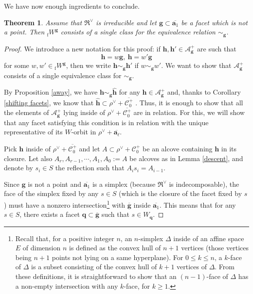 \documentclass[11pt]{amsart}
\theoremstyle{plain}
\newtheorem{thm}{Theorem}[section]
\theoremstyle{remark}
\numberwithin{equation}{section}
\begin{document}
	
	We have now enough ingredients to conclude.
	\begin{thm}\label{thm not points}
		Assume that $\mathfrak{R}^\vee$ is irreducible and let $\mathbf{g}\subset\overline{\mathbf{a}_1}$ be a facet which is not a point. Then ${_\mathrm{f}W}^\mathbf{g}$ consists of a single class for the equivalence relation $\sim_{\mathbf{g}}$.
	\end{thm}
	\begin{proof}We introduce a new notation for this proof: if $\mathbf{h},\mathbf{h}'\in \mathcal{A}^+_\mathbf{g}$ are such that $$\mathbf{h}=w\mathbf{g},~\mathbf{h}=w'\mathbf{g}$$ for some $w,w'\in {_{\mathrm{f}}W}^\mathbf{g}$, then we write $\mathbf{h}\sim_{\mathbf{g}}\mathbf{h}'$ if $w\sim_{\mathbf{g}}w'$. We want to show that $\mathcal{A}^+_\mathbf{g}$ consists of a single equivalence class for $\sim_{\mathbf{g}}$.
		
		By Proposition \ref{away}, we have $\mathbf{h}\sim_{\mathbf{g}}\hat{\mathbf{h}}$ for any $\mathbf{h}\in\mathcal{A}^+_\mathbf{g}$ and, thanks to Corollary \ref{shifting facets}, we know that $\hat{\mathbf{h}}\subset \rho^\vee+ \overline{\mathscr{C}^+_0}$ . Thus, it is enough to show that all the elements of $\mathcal{A}^+_\mathbf{g}$ lying inside of $\rho^\vee+ \overline{\mathscr{C}^+_0}$ are in relation. For this, we will show that any facet satisfying this condition is in relation with the unique representative of its $W$-orbit in $\rho^\vee+\overline{\mathbf{a}_\ell}$.  	
		
		Pick $\mathbf{h}$ inside of $\rho^\vee+\overline{\mathscr{C}^+_0}$ and let $A\subset \rho^\vee+\mathscr{C}^+_0$ be an alcove containing $\mathbf{h}$ in its closure. Let also $A_r,A_{r-1},\cdots,A_1,A_0:=A$ be alcoves as in Lemma \ref{descent}, and denote by $s_i\in S$ the reflection such that $A_is_i=A_{i-1}$. 
		
		Since $\mathbf{g}$ is not a point and $\overline{\mathbf{a}_1}$ is a simplex (because $\mathfrak{R}^\vee$ is indecomposable), the face of the simplex fixed by any $s\in S$ (which is the closure of the facet fixed by $s$) must have a nonzero intersection\footnote{Recall that, for a positive integer $n$, an $n$-simplex $\Delta$ inside of an affine space $E$ of dimension $n$ is defined as the convex hull of $n+1$ vertices (those vertices being $n+1$ points not lying on a same hyperplane). For $0\leq k\leq n$, a $k$-face of $\Delta$ is a subset consisting of the convex hull of $k+1$ vertices of $\Delta$. From these definitions, it is straightforward to show that an $(n-1)$-face of $\Delta$ has a non-empty intersection with any $k$-face, for $k\geq 1$.} with $\overline{\mathbf{g}}$ inside $\overline{\mathbf{a}_1}$. This means that for any $s\in S$, there exists a facet $\mathbf{q}\subset\overline{\mathbf{g}}$ such that $s\in W_\mathbf{q}$. 	
		

\end{proof}
\end{document}
